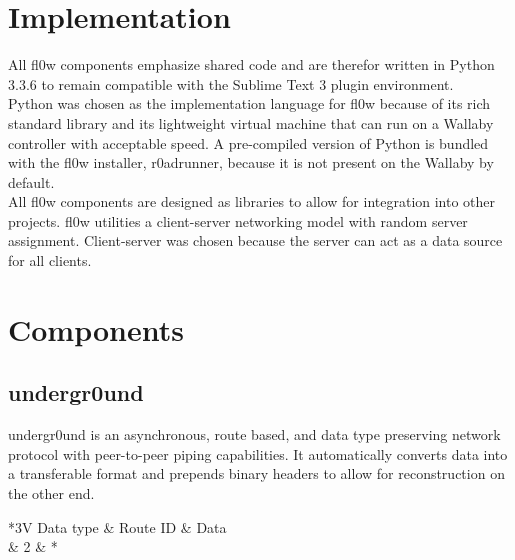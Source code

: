 \documentclass[conference]{IEEEtran}
\begin{document}
\section{Implementation}
All fl0w\cite{fl0w:Philip Trauner} components emphasize shared code and are therefor written in Python\cite{Python:Python Foundation} 3.3.6 to remain compatible with the Sublime Text 3\cite{Sublime Text 3:Sublime HQ} plugin environment. \\Python\cite{Python:Python Foundation} was chosen as the implementation language for fl0w\cite{fl0w:Philip Trauner} because of its rich standard library and its lightweight virtual machine that can run on a Wallaby\cite{Wallaby Controller:KIPR} controller with acceptable speed. A pre-compiled version of Python\cite{Python:Python Foundation} is bundled with the fl0w\cite{fl0w:Philip Trauner} installer, r0adrunner, because it is not present on the Wallaby\cite{Wallaby Controller:KIPR} by default. \\All fl0w\cite{fl0w:Philip Trauner} components are designed as libraries to allow for integration into other projects. fl0w\cite{fl0w:Philip Trauner} utilities a client-server networking model with random server assignment. Client-server was chosen because the server can act as a data source for all clients.

\section{Components}

\subsection{undergr0und}
undergr0und\cite{undergr0und:Philip Trauner} is an asynchronous, route based, and data type preserving network protocol with peer-to-peer piping capabilities.
It automatically converts data into a transferable format and prepends binary headers to allow for reconstruction on the other end.

\begin{table}[H]
\caption{The binary encoding of messages in undergr0und (in bytes)}
\centering
	\begin{tabular}{*{3}{V}}
		Data type & Route ID & Data \\  & 2 & * \\
	\end{tabular}
\label{fig:undergr0und_header}
\end{table}
\end{document}
